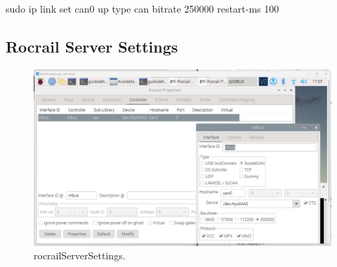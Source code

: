 sudo ip link set can0 up type can bitrate 250000 restart-ms 100


\subsection{Rocrail Server Settings}



\begin{figure}[h!]
	\centering
	\includegraphics[width=1.00\linewidth]{../figures/rocrailServerSettings.png}
	\caption{rocrailServerSettings.}
	\label{fig:rocrailServerSettings}
\end{figure}


